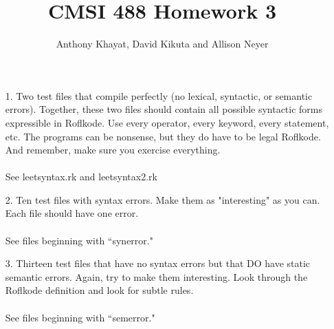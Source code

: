 \documentclass{article}
\title{CMSI 488 Homework 3}
\author{Anthony Khayat, David Kikuta and Allison Neyer}
\begin{document}
\maketitle

\begin{enumerate}
    
\item [1.] Two test files that compile perfectly (no lexical, syntactic, or semantic errors). Together, these two files should contain all possible syntactic forms expressible in Roflkode. Use every operator, every keyword, every statement, etc. The programs can be nonsense, but they do have to be legal Roflkode. And remember, make sure you exercise everything.
\\
\\
See leetsyntax.rk and leetsyntax2.rk

\item [2.] Ten test files with syntax errors. Make them as "interesting" as you can. Each file should have one error.
\\
\\
See files beginning with ``synerror."

\item [3.] Thirteen test files that have no syntax errors but that DO have static semantic errors. Again, try to make them interesting. Look through the Roflkode definition and look for subtle rules.
\\
\\
See files beginning with ``semerror."

\end{enumerate}
    
\end{document}
